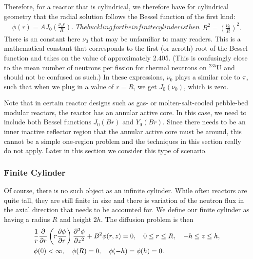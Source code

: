 Therefore, for a reactor that is cylindrical, we therefore have for cylindrical geometry that the radial solution follows the Bessel function of the first kind:
\begin{subequations}
\begin{align}
  \phi(r) = A J_0 \left( \frac{\nu_0 r}{R} \right).
\end{align}
The buckling for the infinite cylinder is then
\begin{align}
 B^2 = \left( \frac{\nu_0}{R} \right)^2 .
\end{align}
\end{subequations}
There is an constant here $\nu_0$ that may be unfamiliar to many readers. This is a mathematical constant that corresponds to the first (or zeroth) root of the Bessel function and takes on the value of approximately 2.405. (This is confusingly close to the mean number of neutrons per fission for thermal neutrons on $^{235}$U and should not be confused as such.) In these expressions, $\nu_0$ plays a similar role to $\pi$, such that when we plug in a value of $r = R$, we get $J_0(\nu_0)$, which is zero.

Note that in certain reactor designs such as gas- or molten-salt-cooled pebble-bed modular reactors, the reactor has an annular active core. In this case, we need to include both Bessel functions $J_0(Br)$ and $Y_0(Br)$. Since there needs to be an inner inactive reflector region that the annular active core must be around, this cannot be a simple one-region problem and the techniques in this section really do not apply. Later in this section we consider this type of scenario.
 
\subsubsection{Finite Cylinder}

Of course, there is no such object as an infinite cylinder. While often reactors are quite tall, they are still finite in size and there is variation of the neutron flux in the axial direction that needs to be accounted for. We define our finite cylinder as having a radius $R$ and height $2h$. The diffusion problem is then
\begin{subequations}
\begin{align}
  &\frac{1}{r} \frac{\partial}{\partial r} \left( r \frac{\partial \phi}{\partial r} \right) \frac{ \partial^2 {\phi} }{ \partial {z}^2 } + B^2 \phi(r,z) = 0, \quad 0 \le r \le R, \quad -h \le z \le h, \\
  &\phi(0) < \infty, \quad \phi(R) = 0, \quad \phi(-h) = \phi(h) = 0.
\end{align}
\end{subequations}

